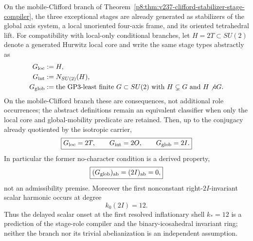 \documentclass[12pt,a4paper]{article}
\begin{document}
\begin{theorem}
\label{p8:thm:2I-selection}
On the mobile-Clifford branch of
Theorem~\ref{p8:thm:v237-clifford-stabilizer-stage-compiler}, the three
exceptional stages are already generated as stabilizers of the global axis
system, a local unoriented four-axis frame, and its oriented tetrahedral lift.
For compatibility with local-only conditional branches, let
\(H=2T\subset SU(2)\) denote a generated Hurwitz local core and write the same
stage types abstractly as
\begin{align}
 G_{\rm loc}&:=H,\label{p8:eq:exceptional-local-role}\\
 G_{\rm int}&:=N_{SU(2)}(H),\label{p8:eq:exceptional-interface-role}\\
 G_{\rm glob}&:=\text{the GP3-least finite }G\subset SU(2)
 \text{ with }H\subsetneq G\text{ and }H\not\triangleleft G.
 \label{p8:eq:exceptional-global-role}
\end{align}
On the mobile-Clifford branch these are consequences, not additional role
occurrences; the abstract definitions remain an equivalent classifier when
only the local core and global-mobility predicate are retained.
Then, up to the conjugacy already quotiented by the isotropic carrier,
\begin{equation}
 \boxed{G_{\rm loc}=2T,\qquad G_{\rm int}=2O,\qquad G_{\rm glob}=2I.}
 \label{p8:eq:exceptional-stage-roles}
\end{equation}
In particular the former no-character condition is a derived property,
\begin{equation}
 \label{p8:eq:I1-no-character}
 \boxed{(G_{\rm glob})_{\rm ab}=(2I)_{\rm ab}=0,}
\end{equation}
not an admissibility premise.  Moreover the first nonconstant
right-\(2I\)-invariant scalar harmonic occurs at degree
\[
 k_0(2I)=12.
\]
Thus the delayed scalar onset at the first resolved inflationary shell
\(k_*=12\) is a prediction of the stage-role compiler and the
binary-icosahedral invariant ring; neither the branch nor its trivial
abelianization is an independent assumption.
\end{theorem}
\end{document}
